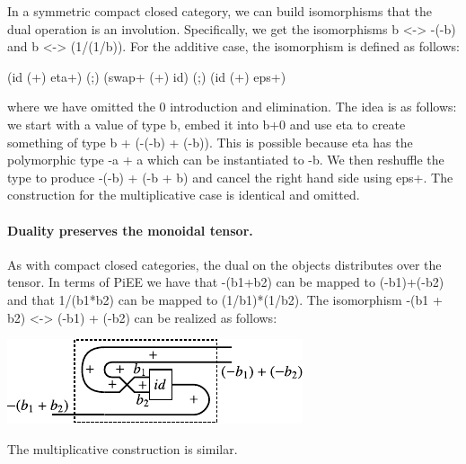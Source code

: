 \documentclass[preprint]{sigplanconf}
\begin{document}
In a symmetric compact closed category, we can build isomorphisms that the
dual operation is an involution. Specifically, we get the isomorphisms 
{{b <-> -(-b)}} and {{b <-> (1/(1/b))}}. For the additive case, the 
isomorphism is defined as follows:

{{ (id (+) eta+) (;) (swap+ (+) id) (;) (id (+) eps+) }}

\noindent where we have omitted the 0 introduction and elimination. The idea
is as follows: we start with a value of type {{b}}, embed it into {{b+0}} and
use {{eta}} to create something of type {{b + (-(-b) + (-b))}}. This is possible
because {{eta}} has the polymorphic type {{-a + a}} which can be instantiated
to {{-b}}. We then reshuffle the type to produce {{-(-b) + (-b + b)}} and cancel
the right hand side using {{eps+}}.  The construction for the multiplicative 
case is identical and omitted.


\paragraph*{Duality preserves the monoidal tensor. }
As with compact closed categories, the dual on the objects distributes
over the tensor. In terms of {{PiEE}} we have that {{-(b1+b2)}}
can be mapped to {{(-b1)+(-b2)}} and that {{1/(b1*b2)}} can be mapped
to {{(1/b1)*(1/b2)}}. The isomorphism {{-(b1 + b2) <-> (-b1) + (-b2)}}
can be realized as follows:
\begin{center}
  \includegraphics{diagrams/dist_neg_plus.pdf}
\end{center}

\noindent
The multiplicative construction is similar. 

\end{document}
